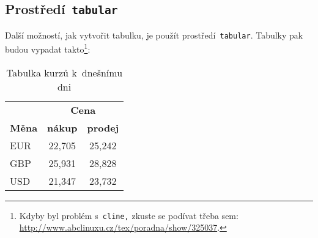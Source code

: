 \documentclass[hidelinks, 11pt, a4paper]{article}
\begin{document}
\subsection{Prostředí\texttt{ tabular}}
Další možností, jak vytvořit tabulku, je použít prostředí\texttt{ tabular}. Tabulky pak budou vypadat takto\footnote[1]{Kdyby byl problém s\texttt{ cline,} zkuste se podívat třeba sem: \href{http://www.abclinuxu.cz/tex/poradna/show/325037}{http://www.abclinuxu.cz/tex/poradna/show/325037}.}:
\bigskip
\begin{table}[h]
    \centering
    \begin{tabular}{|l|c|c|} \hline
        
        & \multicolumn{2}{c|}{\textbf{Cena}} \\
        \cline{2-3}
        \textbf{Měna} & \textbf{nákup}	& \textbf{prodej} \\ \hline
        EUR	 &	22,705  & 25,242 \\
        GBP	&	25,931 &	28,828 \\ 
        USD	&	21,347 &	23,732 \\ \hline
    \end{tabular}
    \caption{Tabulka kurzů k~dnešnímu dni}
    \label{tab:tabulka1}
\end{table}
\bigskip
\end{document}
